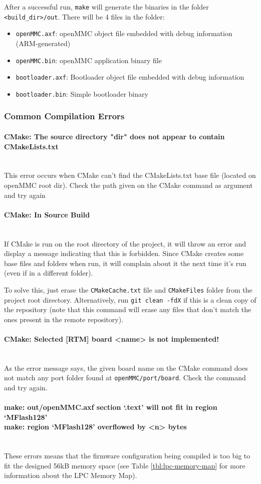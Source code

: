 \documentclass[letterpaper,12pt, titlepage]{article}
\newcommand{\newparagraph}[1]{\paragraph{#1}\mbox{}\\}
\begin{document}
After a successful run, \texttt{make} will generate the binaries in the folder \texttt{<build\_dir>/out}. There will be 4 files in the folder:
\begin{itemize}
  \setlength\itemsep{0em}
\item\texttt{openMMC.axf}: openMMC object file embedded with debug information (ARM-generated)
\item\texttt{openMMC.bin}: openMMC application binary file
\item\texttt{bootloader.axf}: Bootloader object file embedded with debug information
\item\texttt{bootloader.bin}: Simple bootloader binary
\end{itemize}

\subsubsection{Common Compilation Errors}

\newparagraph{CMake: The source directory "dir" does not appear to contain CMakeLists.txt}
This error occurs when CMake can't find the CMakeLists.txt base file (located on openMMC root dir). Check the path given on the CMake command as argument and try again

\newparagraph{CMake: In Source Build}
If CMake is run on the root directory of the project, it will throw an error and display a message indicating that this is forbidden. Since CMake creates some base files and folders when run, it will complain about it the next time it's run (even if in a different folder).

To solve this, just erase the \texttt{CMakeCache.txt} file and \texttt{CMakeFiles} folder from the project root directory. Alternatively, run \texttt{git clean -fdX} if this is a clean copy of the repository (note that this command will erase any files that don't match the ones present in the remote repository).

\newparagraph{CMake: Selected [RTM] board <name> is not implemented!}
As the error message says, the given board name on the CMake command does not match any port folder found at \texttt{openMMC/port/board}. Check the command and try again.

\newparagraph{make: out/openMMC.axf section `.text' will not fit in region `MFlash128' \\ make: region `MFlash128' overflowed by <n> bytes}
These errors means that the firmware configuration being compiled is too big to fit the designed 56kB memory space (see Table \ref{tbl:lpc-memory-map} for more information about the LPC Memory Map).
\end{document}
